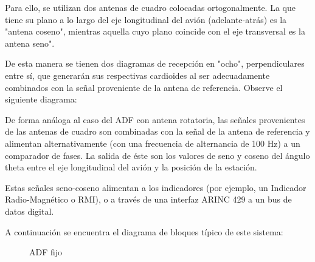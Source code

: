 Para ello, se utilizan dos antenas de cuadro colocadas ortogonalmente. La que tiene su plano a lo largo del eje longitudinal del avi\'on (adelante-atr\'as) es la "antena coseno", mientras aquella cuyo plano coincide con el eje transversal es la antena seno".

De esta manera se tienen dos diagramas de recepci\'on en "ocho", perpendiculares entre s\'i, que generar\'an sus respectivas cardioides al ser adecuadamente combinados con la se\~nal proveniente de la antena de referencia. Observe el siguiente diagrama:



De forma an\'aloga al caso del ADF con antena rotatoria, las se\~nales provenientes de las antenas de cuadro son combinadas con la se\~nal de la antena de referencia y alimentan alternativamente (con una frecuencia de alternancia de 100 Hz) a un comparador de fases. La salida de \'este son los valores de seno y coseno del \'angulo theta entre el eje longitudinal del avi\'on y la posici\'on de la estaci\'on.

Estas se\~nales seno-coseno alimentan a los indicadores (por ejemplo, un Indicador Radio-Magn\'etico o RMI), o a trav\'es de una interfaz ARINC 429 a un bus de datos digital.

A continuaci\'on se encuentra el diagrama de bloques t\'ipico de este sistema:

\begin{figure}[!htb]
  \centering
  \caption{ADF fijo}
\end{figure}

